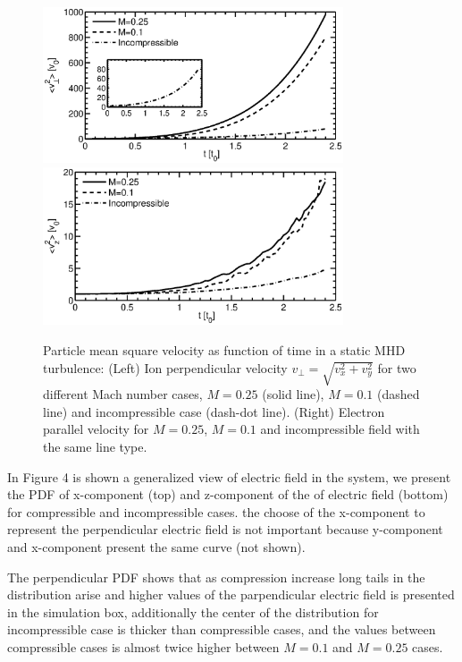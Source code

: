 \documentclass[%
aip,pop,amsmath,amssymb,
 reprint,%
]{revtex4-1}
\begin{document}
\begin{figure}[h!]
\begin{center}
{\includegraphics[width = 3.5in]{./Figures/Fig3_a}}
{\includegraphics[width = 3.5in]{./Figures/Fig3_b}}
\caption{Particle mean square velocity as function of time in a static MHD turbulence: (Left)
Ion perpendicular velocity $v_\perp = \sqrt{v_x^2 + v_y^2}$ for two different Mach number
cases, $M=0.25$ (solid line), $M=0.1$ (dashed line) and incompressible case (dash-dot line). 
(Right) Electron parallel velocity for $M=0.25$, $M=0.1$ and incompressible field with the
same line type.}
\end{center}
\label{mean square velocity}
\end{figure}

In Figure 4 is shown a generalized view of electric field in the system, we present 
the PDF of x-component (top) and z-component of the of electric field (bottom) for 
compressible and incompressible cases. the choose of the x-component to represent the 
perpendicular electric field is not important because y-component and x-component present 
the same curve (not shown).

The perpendicular PDF shows that as compression increase long tails in the 
distribution arise and higher values of the parpendicular electric field is presented in
the simulation box, additionally the center of the distribution for incompressible case is
thicker than compressible cases, and the values between compressible cases is almost twice
higher between $M=0.1$ and $M=0.25$ cases.\\
\end{document}
